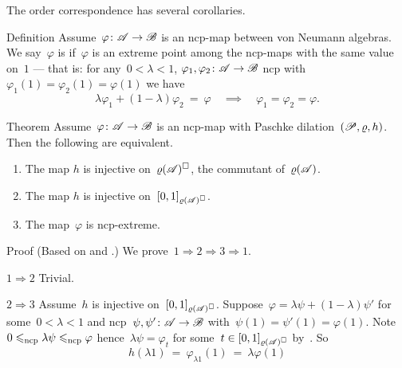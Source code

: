 \documentclass[b]{subfiles}
\begin{document}
\begin{parsec}%
\begin{point}%
The order correspondence 
    has several corollaries.
\end{point}
\begin{point}{Definition}%
Assume~$\varphi\colon \mathscr{A} \to \mathscr{B}$ is an ncp-map between von Neumann
    algebras.
We say~$\varphi$ is 
    if~$\varphi$ is an extreme point among
    the ncp-maps with the same value on~$1$ ---
    that is:
    for any~$0 < \lambda < 1$, $\varphi_1,\varphi_2\colon \mathscr{A} \to \mathscr{B}$
    ncp with~$\varphi_1(1) = \varphi_2(1) = \varphi(1)$
    we have
    \begin{equation*}
    \lambda \varphi_1 + (1-\lambda)\varphi_2 \ =\  \varphi
    \quad \implies \quad
    \varphi_1=\varphi_2=\varphi.
    \end{equation*}
\end{point}
\begin{point}{Theorem}%
Assume~$\varphi\colon \mathscr{A} \to \mathscr{B}$ is an ncp-map
    with Paschke dilation~$(\mathscr{P}, \varrho, h)$.
Then the following are equivalent.
\begin{enumerate}
    \item The map $h$ is injective on~$\varrho(\mathscr{A})^\square$,
                the commutant of~$\varrho(\mathscr{A})$.
    \item The map $h$ is injective on~$[0,1]_{\varrho(\mathscr{A})^\square}$.
    \item The map~$\varphi$ is ncp-extreme.
\end{enumerate}
\begin{point}{Proof}%
(Based on \cite[Prop.~1.4.6]{arveson}
    and \cite[Thm.~5.4]{paschke}.)
We prove~$1 \Rightarrow 2 \Rightarrow 3 \Rightarrow 1$.
\begin{point}{$1 \Rightarrow 2$}%
Trivial.
\end{point}
\begin{point}{$2 \Rightarrow 3$}%
Assume~$h$ is injective on~$[0,1]_{\varrho(\mathscr{A})^\square}$.
Suppose~$\varphi = \lambda \psi + (1 - \lambda) \psi'$
    for some~$0 < \lambda < 1$
    and ncp~$\psi,\psi'\colon \mathscr{A} \to \mathscr{B}$
    with~$\psi(1) = \psi'(1) = \varphi(1)$.
Note~$0 \leqslant_{\mathrm{ncp}} \lambda\psi \leqslant_{\mathrm{ncp}} \varphi$
hence~$\lambda\psi = \varphi_t$ for some~$t \in [0,1]_{\varrho(\mathscr{A})^\square}$
by~.
So
\begin{equation*}
    h(\lambda 1)
    \ =\  \varphi_{\lambda1}(1) \ =\  \lambda \varphi(1) 

\end{equation*}
\end{point}
\end{point}
\end{point}
\end{parsec}
\end{document}
